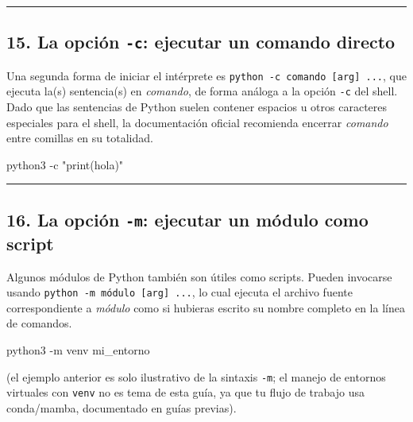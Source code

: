 \documentclass[
  doc,
  floatsintext,
  longtable,
  a4paper,
  nolmodern,
  notxfonts,
  notimes,
  12pt,
  colorlinks=true,linkcolor=blue,citecolor=blue,urlcolor=blue]{apa7}
\newenvironment{Shaded}{\begin{snugshade}}{\end{snugshade}}
\newcommand{\AttributeTok}[1]{\textcolor[rgb]{0.40,0.45,0.13}{#1}}
\newcommand{\ExtensionTok}[1]{\textcolor[rgb]{0.00,0.23,0.31}{#1}}
\newcommand{\NormalTok}[1]{\textcolor[rgb]{0.00,0.23,0.31}{#1}}
\newcommand{\StringTok}[1]{\textcolor[rgb]{0.13,0.47,0.30}{#1}}
\begin{document}
\begin{center}\rule{0.5\linewidth}{0.5pt}\end{center}

\subsection{\texorpdfstring{15. La opción \texttt{-c}: ejecutar un
comando
directo}{15. La opción -c: ejecutar un comando directo}}\label{la-opciuxf3n--c-ejecutar-un-comando-directo}

Una segunda forma de iniciar el intérprete es
\texttt{python\ -c\ comando\ {[}arg{]}\ ...}, que ejecuta la(s)
sentencia(s) en \emph{comando}, de forma análoga a la opción \texttt{-c}
del shell. Dado que las sentencias de Python suelen contener espacios u
otros caracteres especiales para el shell, la documentación oficial
recomienda encerrar \emph{comando} entre comillas en su totalidad.

\begin{Shaded}
\begin{Highlighting}[]
\ExtensionTok{python3} \AttributeTok{{-}c} \StringTok{"print(\textquotesingle{}hola\textquotesingle{})"}
\end{Highlighting}
\end{Shaded}

\begin{center}\rule{0.5\linewidth}{0.5pt}\end{center}

\subsection{\texorpdfstring{16. La opción \texttt{-m}: ejecutar un
módulo como
script}{16. La opción -m: ejecutar un módulo como script}}\label{la-opciuxf3n--m-ejecutar-un-muxf3dulo-como-script}

Algunos módulos de Python también son útiles como scripts. Pueden
invocarse usando \texttt{python\ -m\ módulo\ {[}arg{]}\ ...}, lo cual
ejecuta el archivo fuente correspondiente a \emph{módulo} como si
hubieras escrito su nombre completo en la línea de comandos.

\begin{Shaded}
\begin{Highlighting}[]
\ExtensionTok{python3} \AttributeTok{{-}m}\NormalTok{ venv mi\_entorno}
\end{Highlighting}
\end{Shaded}

(el ejemplo anterior es solo ilustrativo de la sintaxis \texttt{-m}; el
manejo de entornos virtuales con \texttt{venv} no es tema de esta guía,
ya que tu flujo de trabajo usa conda/mamba, documentado en guías
previas).
\end{document}
